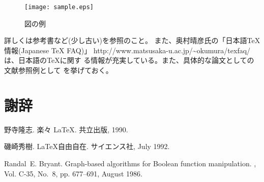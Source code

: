 \documentclass[a4paper,11pt]{jreport}
\begin{document}
\begin{figure}[htbp]
\begin{center}
\texttt{[image: sample.eps]}
\end{center}
\caption{図の例}
\label{figure:sample}
\end{figure}

詳しくは参考書など(少し古い)\cite{RakRak}\cite{JiyuuJizai}を参照のこと。
また、奥村晴彦氏の「日本語\TeX 情報(Japanese TeX FAQ)」
http://www.matsusaka-u.ac.jp/\~{}okumura/texfaq/ は、日本語の\TeX に関す
る情報が充実している。また、具体的な論文としての文献参照例として
\cite{bryant-ieeetc86}を挙げておく。


\chapter*{謝辞}

\newpage

\renewcommand{\bibname}{参考文献}

%
%

\begin{thebibliography}{1}
野寺隆志.
\newblock 楽々 \LaTeX.
\newblock 共立出版, 1990.

磯崎秀樹.
\newblock \LaTeX 自由自在.
\newblock サイエンス社, July 1992.

Randal~E. Bryant.
\newblock Graph-based algorithms for {B}oolean function manipulation.
, Vol. C-35, No.~8, pp. 677--691,
  August 1986.
\end{thebibliography}
\end{document}
